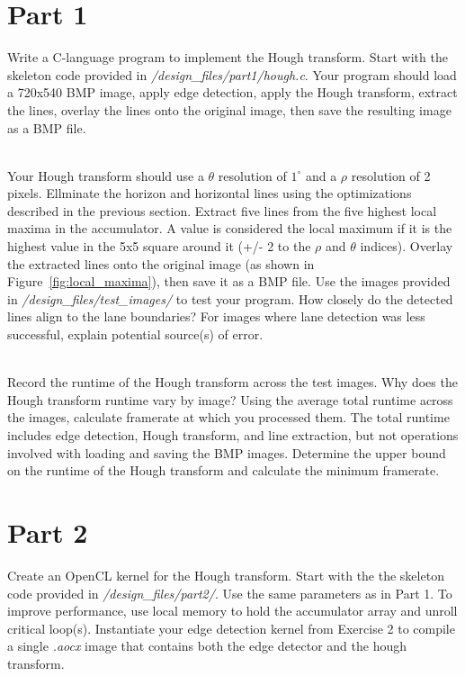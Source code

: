 \documentclass[epsfig,10pt,fullpage]{article}
\begin{document}
\section*{Part 1}

Write a C-language program to implement the Hough transform. 
Start with the skeleton code provided in \textit{/design\_files/part1/hough.c}. 
Your program should load a 720x540 BMP image, apply edge detection, apply the Hough transform, extract the lines, 
overlay the lines onto the original image, then save the resulting image as a BMP file. 

~\\
Your Hough transform should use a $\theta$ resolution of $1^\circ$ and a $\rho$ resolution of 2 pixels. 
Ellminate the horizon and horizontal lines using the optimizations described in the previous section.
Extract five lines from the five highest local maxima in the accumulator. 
A value is considered the local maximum if it is the highest value in the 5x5 square around it (+/- 2 to the $\rho$ and $\theta$ indices). 
Overlay the extracted lines onto the original image (as shown in Figure~\ref{fig:local_maxima}), then save it as a BMP file. 
Use the images provided in \textit{/design\_files/test\_images/} to test your program.
How closely do the detected lines align to the lane boundaries? For images
where lane detection was less successful, explain potential source(s) of error.

~\\
Record the runtime of the Hough transform across the test images.
Why does the Hough transform runtime vary by image?
Using the average total runtime across the images, calculate framerate at which you processed them.
The total runtime includes edge detection, Hough transform, and line extraction, but not operations
involved with loading and saving the BMP images.
Determine the upper bound on the runtime of the Hough transform and calculate the minimum framerate.


\section*{Part 2}

Create an OpenCL kernel for the Hough transform. Start with the
the skeleton code provided in \textit{/design\_files/part2/}. 
Use the same parameters as in Part 1.
To improve performance, use local memory to hold the accumulator array and unroll critical loop(s).
Instantiate your edge detection kernel from Exercise 2 to compile a single \textit{.aocx} image that 
contains both the edge detector and the hough transform.
\end{document}
